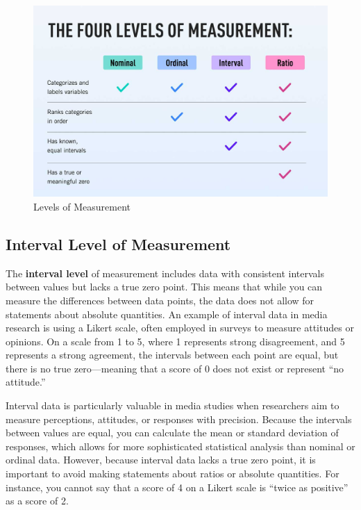 \documentclass[
]{book}
\begin{document}
\begin{figure}
\centering
\includegraphics[width=1\textwidth,height=\textheight]{images/levels.jpg}
\caption{Levels of Measurement}
\end{figure}

\subsection*{Interval Level of Measurement}\label{interval-level-of-measurement}

The \textbf{interval level} of measurement includes data with consistent intervals between values but lacks a true zero point. This means that while you can measure the differences between data points, the data does not allow for statements about absolute quantities. An example of interval data in media research is using a Likert scale, often employed in surveys to measure attitudes or opinions. On a scale from 1 to 5, where 1 represents strong disagreement, and 5 represents a strong agreement, the intervals between each point are equal, but there is no true zero---meaning that a score of 0 does not exist or represent ``no attitude.''

Interval data is particularly valuable in media studies when researchers aim to measure perceptions, attitudes, or responses with precision. Because the intervals between values are equal, you can calculate the mean or standard deviation of responses, which allows for more sophisticated statistical analysis than nominal or ordinal data. However, because interval data lacks a true zero point, it is important to avoid making statements about ratios or absolute quantities. For instance, you cannot say that a score of 4 on a Likert scale is ``twice as positive'' as a score of 2.
\end{document}
